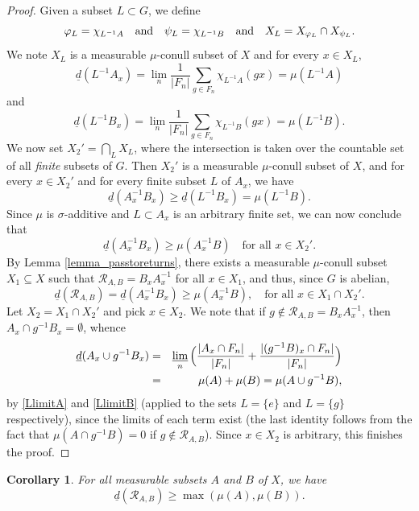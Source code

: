 \documentclass[JEP,XML,SOM,Unicode]{cedram}
\let\mathcal\mathscr
\newcommand{\cR}{\mathcal{R}}
\newcommand{\qand}{\quad\textup{and}\quad}
\theoremstyle{plain}
\newtheorem{corollary}[theorem]{Corollary}
\theoremstyle{definition}
\begin{document}
\begin{proof}
Given a subset $L \subset G$, we define
\[
\varphi_L = \chi_{L^{-1}A} \qand \psi_L = \chi_{L^{-1}B} \qand X_L = X_{\varphi_L} \cap X_{\psi_L}.
\]
We note $X_L$ is a measurable $\mu$-conull subset of $X$ and for every $x \in X_L$,
\begin{equation}
\label{LlimitA}
\underline{d}(L^{-1}A_x) = \lim_n \frac{1}{|F_n|} \sum_{g \in F_n} \chi_{L^{-1}A}(gx) = \mu(L^{-1}A)
\end{equation}
and
\begin{equation}
\label{LlimitB}
\underline{d}(L^{-1}B_x) = \lim_n \frac{1}{|F_n|} \sum_{g \in F_n} \chi_{L^{-1}B}(gx) = \mu(L^{-1}B).
\end{equation}
We now set $X_2' = \bigcap_{L} X_L$, where the intersection is taken over the countable set of all \emph{finite} subsets of $G$. Then
$X_2'$ is a measurable $\mu$-conull subset of $X$, and for every $x \in X_2'$ and for every finite subset $L$ of $A_x$, we have
\[
\underline{d}(A_x^{-1}B_x) \geq \underline{d}(L^{-1}B_x) = \mu(L^{-1}B).
\]
Since $\mu$ is $\sigma$-additive and $L \subset A_x$ is an arbitrary finite set, we can now conclude that
\[
\underline{d}(A_x^{-1}B_x) \geq \mu(A_x^{-1}B) \quad \textrm{for all $x \in X_2'$}.
\]
By Lemma \ref{lemma_passtoreturns}, there exists a measurable $\mu$-conull subset $X_1 \subseteq X$ such that
$\cR_{A,B} = B_x A_x^{-1}$ for all $x \in X_1$, and thus, since $G$ is abelian,
\[
\underline{d}(\cR_{A,B}) = \underline{d}(A_x^{-1}B_x) \geq \mu(A_x^{-1}B), \quad \textrm{for all $x \in X_1 \cap X_2'$}.
\]
Let $X_2 = X_1 \cap X_2'$ and pick $x \in X_2$. We note that if $g \notin \cR_{A,B} = B_x A_x^{-1}$, then $A_x \cap g^{-1}B_x = \emptyset$,
whence
\begin{eqnarray*}
\underline{d}(A_x \cup g^{-1}B_x)
&=&
\varliminf_n \Big( \frac{|A_x \cap F_n|}{|F_n|} + \frac{|(g^{-1}B)_x \cap F_n|}{|F_n|} \Big) \\
&=&
\mu(A) + \mu(B) = \mu(A \cup g^{-1}B),
\end{eqnarray*}
by \eqref{LlimitA} and \eqref{LlimitB} (applied to the sets $L = \{e\}$ and $L = \{g\}$ respectively), since the limits of each term exist
(the last identity follows from the fact that $\mu(A \cap g^{-1}B) = 0$ if $g \notin \cR_{A,B}$). Since $x \in X_2$ is arbitrary, this finishes the proof.
\end{proof}

\begin{corollary}
\label{cor_max}
For all measurable subsets $A$ and $B$ of $X$, we have
\[
\underline{d}(\cR_{A,B}) \geq \max(\mu(A),\mu(B)).
\]
\end{corollary}
\end{document}
